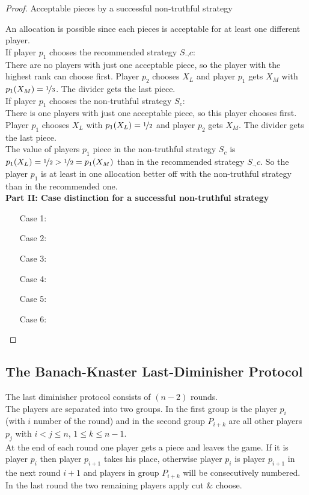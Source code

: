 \begin{proof}
\begin{table}[htb]
\caption{Acceptable pieces by a successful non-truthful strategy}\label{Table11}
\end{table}
\newpage An allocation is possible since each pieces is acceptable for at least one different player.\\ \newline If player $p_1$ chooses the recommended strategy $S_\neg c$:\\
There are no players with just one acceptable piece, so the player with the highest rank can choose first.
Player $p_2$ chooses $X_L$ and player $p_1$ gets $X_M$ with $p_1(X_M)= \nicefrac{1}{3}$. The divider gets the last piece.\\
\newline
If player $p_1$ chooses the non-truthful strategy $S_c$:\\
There is one players with just one acceptable piece, so this player chooses first.
Player $p_1$ chooses $X_L$ with $p_1(X_L)= \nicefrac{1}{2}$ and player $p_2$ gets $X_M$. The divider gets the last piece.\\
The value of players $p_1$ piece in the non-truthful strategy $S_c$ is $p_1(X_L)=\nicefrac{1}{2}>\nicefrac{1}{2}=p_1(X_M)$ than in the recommended strategy $S_\neg c$. So the player $p_1$ is at least in one allocation better off with the non-truthful strategy than in the recommended one.\\
\newline
\textbf{Part II: Case distinction for a successful non-truthful strategy} 
\begin{itemize}
\item[Case] 1: 
\item[Case] 2:
\item[Case] 3:
\item[Case] 4:
\item[Case] 5:
\item[Case] 6:
\end{itemize}
\end{proof}
\newpage
\subsection{The Banach-Knaster Last-Diminisher Protocol}
The last diminisher protocol consists of $(n-2)$ rounds.\\The players are separated into two groups. In the first group is the player $p_i$ (with $i$ number of the round) and in the second group $P_{i+k}$ are all other players $p_j$ with $i <j\leq n$, $1\leq k \leq n-1$.\\ At the end of each round one player gets a piece and leaves the game. If it is player $p_i$ then player $p_{i+1}$ takes his place, otherwise player $p_i$ is player $p_{i+1}$ in the next round $i+1$ and players in group $P_{i+k}$ will be consecutively numbered. In the last round the two remaining players apply cut $\&$ choose. 

